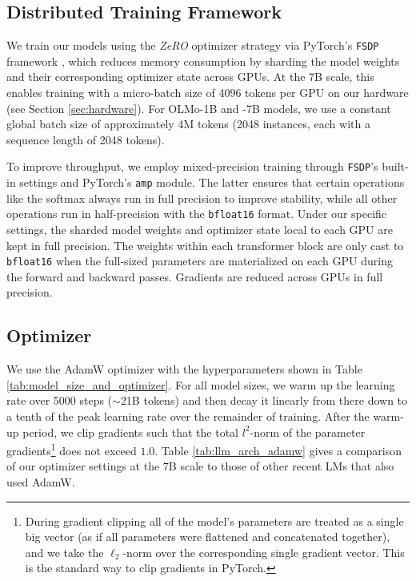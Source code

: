 \documentclass[11pt]{article}
\newcommand{\olmo}{OLMo\xspace}
\begin{document}
\subsection{Distributed Training Framework}
\label{sec:training-distributed}

We train our models using the \emph{ZeRO} optimizer strategy \citep{Rajbhandari2019ZeRO} via PyTorch's \texttt{FSDP} framework \citep{Zhao2023PyTorchFSDP}, which reduces memory consumption by sharding the model weights and their corresponding optimizer state across GPUs.
At the 7B scale, this enables training with a micro-batch size of 4096 tokens per GPU on our hardware (see Section \ref{sec:hardware}).
For \olmo-1B and -7B models, we use a constant global batch size of approximately 4M tokens (2048 instances, each with a sequence length of 2048 tokens).

To improve throughput, we employ mixed-precision training \citep{Micikevicius2017MixedPT} through \texttt{FSDP}'s built-in settings and PyTorch's \texttt{amp} module.
The latter ensures that certain operations like the softmax always run in full precision to improve stability, while all other operations run in half-precision with the \texttt{bfloat16} format. 
Under our specific settings, the sharded model weights and optimizer state local to each GPU are kept in full precision.
The weights within each transformer block are only cast to \texttt{bfloat16} when the full-sized parameters are materialized on each GPU during the forward and backward passes.
Gradients are reduced across GPUs in full precision.

\subsection{Optimizer}
\label{sec:training-optimizer}

We use the AdamW optimizer \citep{loshchilov2018decoupled} with the hyperparameters shown in Table \ref{tab:model_size_and_optimizer}.
For all model sizes, we warm up the learning rate over 5000 steps ($\sim$21B tokens) and then decay it linearly from there down to a tenth of the peak learning rate over the remainder of training.
After the warm-up period, we clip gradients such that the total $l^2$-norm of the parameter gradients\footnote{During gradient clipping all of the model's parameters are treated as a single big vector (as if all parameters were flattened and concatenated together), and we take the $\ell_2$-norm over the corresponding single gradient vector. This is the standard way to clip gradients in PyTorch.} does not exceed $1.0$. Table \ref{tab:llm_arch_adamw} gives a comparison of our optimizer settings at the 7B scale to those of other recent LMs that also used AdamW.
\end{document}

